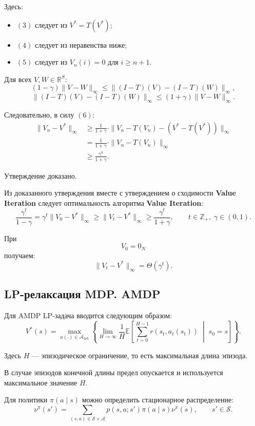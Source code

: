 \documentclass[12pt,a4paper]{article}
\begin{document}
Здесь:
\begin{itemize}
    \item $(3)$ следует из $V^\ast = T(V^\ast)$;
    \item $(4)$ следует из неравенства ниже;
    \item $(5)$ следует из $V_n(i)=0$ для $i \ge n+1$.
\end{itemize}

Для всех $V,W \in \mathbb R^S$:
\[
(1-\gamma)\|V-W\|_\infty
\le
\|(I-T)(V)-(I-T)(W)\|_\infty,
\]
\[
\|(I-T)(V)-(I-T)(W)\|_\infty
\le
(1+\gamma)\|V-W\|_\infty.
\tag{6}
\]

Следовательно, в силу $(6)$:
\[
\begin{aligned}
\|V_n - V^\ast\|_\infty
&\ge
\frac{1}{1+\gamma}
\cdot
\|V_n - T(V_n) - (V^\ast - T(V^\ast))\|_\infty
\\
&=
\frac{1}{1+\gamma}
\cdot
\|V_n - T(V_n)\|_\infty
\\
&\ge
\frac{\gamma^n}{1+\gamma}.
\end{aligned}
\]

Утверждение доказано.

Из доказанного утверждения вместе с утверждением о сходимости \textbf{Value Iteration} следует оптимальность алгоритма \textbf{Value Iteration}:
\[
\frac{\gamma^t}{1-\gamma}
=
\gamma^t \|V_0 - V^\ast\|_\infty
\ge
\|V_t - V^\ast\|_\infty
\ge
\frac{\gamma^t}{1+\gamma},
\qquad
t \in \mathbb Z_+,\; \gamma \in (0,1).
\]

При
\[
V_0 = 0_N
\]
получаем:
\[
\|V_t - V^\ast\|_\infty
=
\Theta(\gamma^t).
\]

\subsection{LP-релаксация MDP. AMDP}

Для AMDP LP-задача вводится следующим образом:
\[
V^\ast(s)
=
\max_{a(\cdot) \in \mathcal A_{\mathrm{det}}}
\left\{
\lim_{H \to \infty}
\frac{1}{H}
\mathbb E
\left[
\sum_{t=0}^{H-1}
r(s_t,a_t(s_t))
\;\middle|\;
s_0=s
\right]
\right\}.
\]

Здесь $H$ --- эпизодическое ограничение, то есть максимальная длина эпизода.

В случае эпизодов конечной длины предел опускается и используется максимальное значение $H$.

Для политики $\pi(a \mid s)$ можно определить стационарное распределение:
\[
\nu^\pi(s')
=
\sum_{(s,a) \in \mathcal S \times \mathcal A}
p(s,a;s')\pi(a \mid s)\nu^\pi(s),
\qquad
s' \in \mathcal S.
\]
\end{document}

